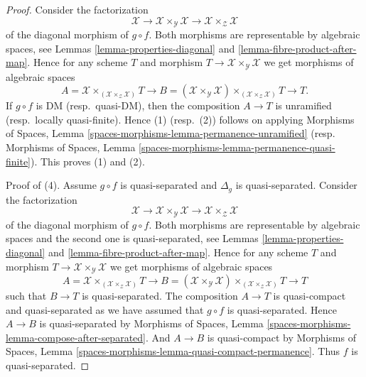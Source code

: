 \begin{proof}
Consider the factorization
$$
\mathcal{X} \to
\mathcal{X} \times_\mathcal{Y} \mathcal{X} \to
\mathcal{X} \times_\mathcal{Z} \mathcal{X}
$$
of the diagonal morphism of $g \circ f$. Both morphisms are representable by
algebraic spaces, see
Lemmas \ref{lemma-properties-diagonal} and
\ref{lemma-fibre-product-after-map}.
Hence for any scheme $T$ and morphism
$T \to \mathcal{X} \times_\mathcal{Y} \mathcal{X}$
we get morphisms of algebraic spaces
$$
A = \mathcal{X} \times_{(\mathcal{X} \times_\mathcal{Z} \mathcal{X})} T
\longrightarrow
B = (\mathcal{X} \times_\mathcal{Y} \mathcal{X})
\times_{(\mathcal{X} \times_\mathcal{Z} \mathcal{X})} T
\longrightarrow
T.
$$
If $g \circ f$ is DM (resp.\ quasi-DM), then the composition $A \to T$
is unramified (resp.\ locally quasi-finite). Hence (1) (resp.\ (2))
follows on applying
Morphisms of Spaces, Lemma
\ref{spaces-morphisms-lemma-permanence-unramified}
(resp.
Morphisms of Spaces,
Lemma \ref{spaces-morphisms-lemma-permanence-quasi-finite}).
This proves (1) and (2).

\medskip\noindent
Proof of (4). Assume $g \circ f$ is quasi-separated and $\Delta_g$ is
quasi-separated. Consider the factorization
$$
\mathcal{X} \to
\mathcal{X} \times_\mathcal{Y} \mathcal{X} \to
\mathcal{X} \times_\mathcal{Z} \mathcal{X}
$$
of the diagonal morphism of $g \circ f$. Both morphisms are
representable by algebraic spaces and the second one is quasi-separated, see
Lemmas \ref{lemma-properties-diagonal} and
\ref{lemma-fibre-product-after-map}.
Hence for any scheme $T$ and morphism
$T \to \mathcal{X} \times_\mathcal{Y} \mathcal{X}$
we get morphisms of algebraic spaces
$$
A = \mathcal{X} \times_{(\mathcal{X} \times_\mathcal{Z} \mathcal{X})} T
\longrightarrow
B = (\mathcal{X} \times_\mathcal{Y} \mathcal{X})
\times_{(\mathcal{X} \times_\mathcal{Z} \mathcal{X})} T
\longrightarrow
T
$$
such that $B \to T$ is quasi-separated.
The composition $A \to T$ is quasi-compact and quasi-separated
as we have assumed that $g \circ f$ is quasi-separated.
Hence $A \to B$ is quasi-separated by
Morphisms of Spaces,
Lemma \ref{spaces-morphisms-lemma-compose-after-separated}.
And $A \to B$ is quasi-compact by
Morphisms of Spaces,
Lemma \ref{spaces-morphisms-lemma-quasi-compact-permanence}.
Thus $f$ is quasi-separated.


\end{proof}
